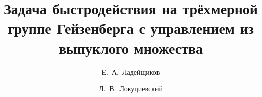 \newcommand{\So}[1][\theta^o]{\sin_{\Omega^o}{#1}}

\newcommand{\Ci}[1][\theta]{\cos_{\Omega}{#1}}

\newcommand{\Co}[1][\theta^o]{\cos_{\Omega^o}{#1}}

\newcommand{\Ti}[1][\theta]{\tan_{\Omega}{#1}}

\newcommand{\To}[1][\theta^o]{\tan_{\Omega^o}{#1}}

\newcommand{\ATi}{\arctan_{\Omega}\theta}

\newcommand{\ATo}[1][\theta^o]{\arctan_{\Omega^o}{#1}}
\fi





\usepackage[russian]{nla}

%
%


%




%
\fi

\title{Задача быстродействия на трёхмерной группе Гейзенберга с управлением из выпуклого множества}
\author{Е.~А.~Ладейщиков  %
  \and  %
  Л.~В.~Локуциевский
  \and
} %

